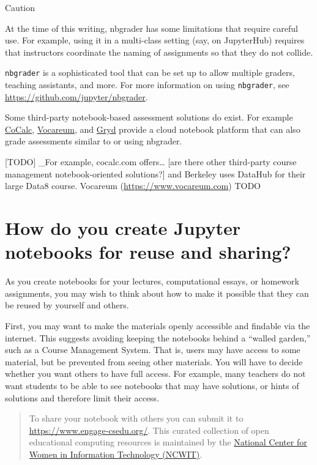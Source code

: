 \documentclass[]{book}
\begin{document}
Caution

At the time of this writing, nbgrader has some limitations that require
careful use. For example, using it in a multi-class setting (say, on
JupyterHub) requires that instructors coordinate the naming of
assignments so that they do not collide.

\texttt{nbgrader} is a sophisticated tool that can be set up to allow
multiple graders, teaching assistants, and more. For more information on
using \texttt{nbgrader}, see \url{https://github.com/jupyter/nbgrader}.

Some third-party notebook-based assessment solutions do exist. For
example \href{www.cocalc.com}{CoCalc},
\href{www.vocareum.com}{Vocareum}, and \href{https://gryd.us}{Gryd}
provide a cloud notebook platform that can also grade assessments
similar to or using nbgrader.

{[}TODO{]} \_For example, cocalc.com offers\ldots{} {[}are there other
third-party course management notebook-oriented solutions?{]} and
Berkeley uses DataHub for their large Data8 course. Vocareum
(\url{https://www.vocareum.com}) TODO

\section{How do you create Jupyter notebooks for reuse and
sharing?}\label{how-do-you-create-jupyter-notebooks-for-reuse-and-sharing}

As you create notebooks for your lectures, computational essays, or
homework assignments, you may wish to think about how to make it
possible that they can be reused by yourself and others.

First, you may want to make the materials openly accessible and findable
via the internet. This suggests avoiding keeping the notebooks behind a
``walled garden,'' such as a Course Management System. That is, users
may have access to some material, but be prevented from seeing other
materials. You will have to decide whether you want others to have full
access. For example, many teachers do not want students to be able to
see notebooks that may have solutions, or hints of solutions and
therefore limit their access.

\begin{quote}
To share your notebook with others you can submit it to
\url{https://www.engage-csedu.org/}. This curated collection of open
educational computing resources is maintained by the
\href{https://www.ncwit.org/}{National Center for Women in Information
Technology (NCWIT)}.
\end{quote}
\end{document}

